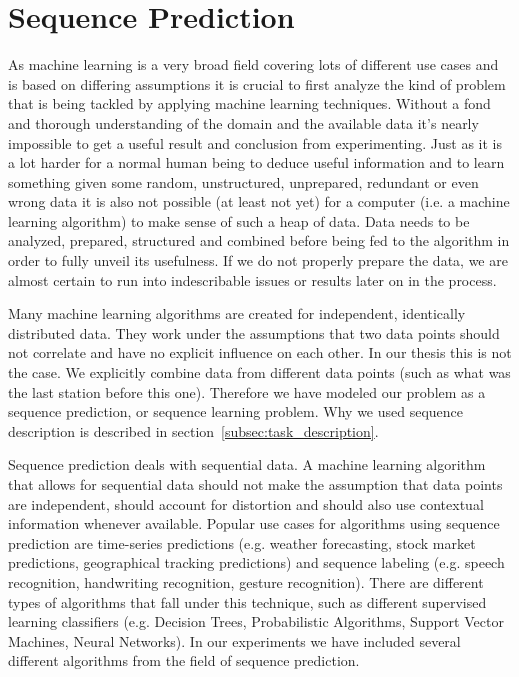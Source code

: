 \newpage
\section{Sequence Prediction}
As machine learning is a very broad field covering lots of different use cases and is based on differing assumptions it is crucial to first analyze the kind of problem that is being tackled by applying machine learning techniques. Without a fond and thorough understanding of the domain and the available data it's nearly impossible to get a useful result and conclusion from experimenting. Just as it is a lot harder for a normal human being to deduce useful information and to learn something given some random, unstructured, unprepared, redundant or even wrong data it is also not possible (at least not yet) for a computer (i.e. a machine learning algorithm) to make sense of such a heap of data. Data needs to be analyzed, prepared, structured and combined before being fed to the algorithm in order to fully unveil its usefulness. If we do not properly prepare the data, we are almost certain to run into indescribable issues or results later on in the process.

Many machine learning algorithms are created for independent, identically distributed data. They work under the assumptions that two data points should not correlate and have no explicit influence on each other. In our thesis this is not the case. We explicitly combine data from different data points (such as what was the last station before this one). Therefore we have modeled our problem as a sequence prediction, or sequence learning problem. Why we used sequence description is described in section~\ref{subsec:task_description}. 

Sequence prediction deals with sequential data. A machine learning algorithm that allows for sequential data should not make the assumption that  data points are independent, should account for distortion and should also use contextual information whenever available. Popular use cases for algorithms using sequence prediction are time-series predictions (e.g. weather forecasting, stock market predictions, geographical tracking predictions) and sequence labeling (e.g. speech recognition, handwriting recognition, gesture recognition). There are different types of algorithms that fall under this technique, such as different supervised learning classifiers (e.g. Decision Trees, Probabilistic Algorithms, Support Vector Machines, Neural Networks). In our experiments we have included several different algorithms from the field of sequence prediction.

